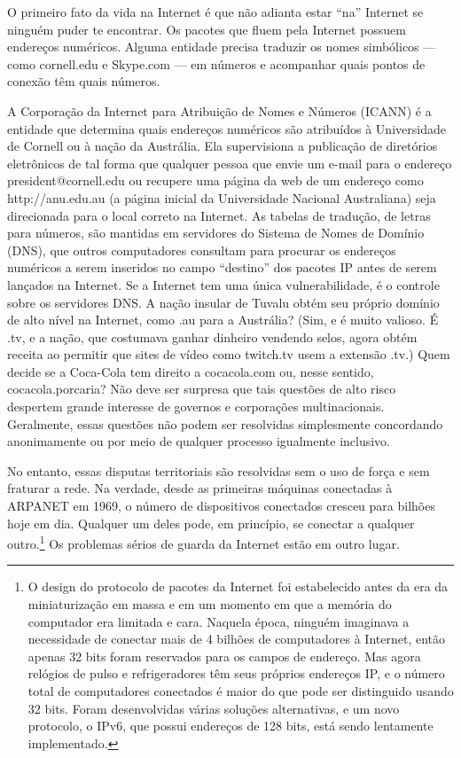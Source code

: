 O primeiro fato da vida na Internet é que não adianta estar ``na'' Internet se ninguém
puder te encontrar. Os pacotes que fluem pela Internet possuem endereços numéricos. Alguma
entidade precisa traduzir os nomes simbólicos --- como cornell.edu e Skype.com --- em
números e acompanhar quais pontos de conexão têm quais números.

A Corporação da Internet para Atribuição de Nomes e Números (ICANN) é a entidade que
determina quais endereços numéricos são atribuídos à Universidade de Cornell ou à nação da
Austrália. Ela supervisiona a publicação de diretórios eletrônicos de tal forma que qualquer
pessoa que envie um e-mail para o endereço president@cornell.edu ou recupere uma página da
web de um endereço como http://anu.edu.au (a página inicial da Universidade Nacional
Australiana) seja direcionada para o local correto na Internet. As tabelas de tradução, de
letras para números, são mantidas em servidores do Sistema de Nomes de Domínio (DNS), que
outros computadores consultam para procurar os endereços numéricos a serem inseridos no campo
``destino'' dos pacotes IP antes de serem lançados na Internet. Se a Internet tem uma única
vulnerabilidade, é o controle sobre os servidores DNS. A nação insular de Tuvalu obtém seu
próprio domínio de alto nível na Internet, como .au para a Austrália? (Sim, e é muito valioso.
É .tv, e a nação, que costumava ganhar dinheiro vendendo selos, agora obtém receita ao permitir
que sites de vídeo como twitch.tv usem a extensão .tv.) Quem decide se a Coca-Cola tem direito
a cocacola.com ou, nesse sentido, cocacola.porcaria? Não deve ser surpresa que tais questões de
alto risco despertem grande interesse de governos e corporações multinacionais. Geralmente,
essas questões não podem ser resolvidas simplesmente concordando anonimamente ou por meio de
qualquer processo igualmente inclusivo.

No entanto, essas disputas territoriais são resolvidas sem o uso de força e sem fraturar a rede.
Na verdade, desde as primeiras máquinas conectadas à ARPANET em 1969, o número de dispositivos
conectados cresceu para bilhões hoje em dia. Qualquer um deles pode, em princípio, se conectar
a qualquer outro.\footnote{O design do protocolo de pacotes da Internet foi estabelecido antes
da era da miniaturização em massa e em um momento em que a memória do computador era limitada e
cara. Naquela época, ninguém imaginava a necessidade de conectar mais de 4 bilhões de
computadores à Internet, então apenas 32 bits foram reservados para os campos de endereço. Mas
agora relógios de pulso e refrigeradores têm seus próprios endereços IP, e o número total de
computadores conectados é maior do que pode ser distinguido usando 32 bits. Foram desenvolvidas
várias soluções alternativas, e um novo protocolo, o IPv6, que possui endereços de 128 bits,
está sendo lentamente implementado.} Os problemas sérios de guarda da Internet estão em outro
lugar.

